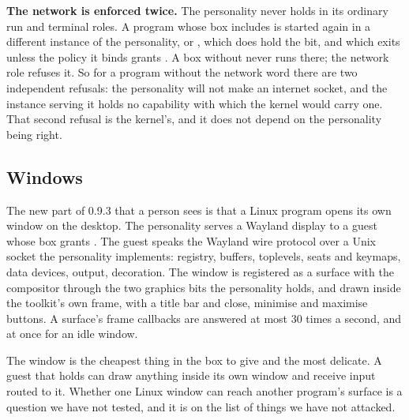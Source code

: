 \textbf{The network is enforced twice.} The personality never holds  in its ordinary run and terminal roles. A program whose box includes  is started again in a different instance of the personality,  or , which does hold the  bit, and which exits unless the policy it binds grants . A box without  never runs there; the network role refuses it. So for a program without the network word there are two independent refusals: the personality will not make an internet socket, and the instance serving it holds no capability with which the kernel would carry one. That second refusal is the kernel's, and it does not depend on the personality being right.

\subsection{Windows}

The new part of 0.9.3 that a person sees is that a Linux program opens its own window on the \nonos{} desktop. The personality serves a Wayland display to a guest whose box grants . The guest speaks the Wayland wire protocol over a Unix socket the personality implements: registry,  buffers,  toplevels, seats and keymaps, data devices, output, decoration. The window is registered as a surface with the compositor through the two graphics bits the personality holds, and drawn inside the toolkit's own frame, with a \nonos{} title bar and close, minimise and maximise buttons. A surface's frame callbacks are answered at most 30 times a second, and at once for an idle window.

The window is the cheapest thing in the box to give and the most delicate. A guest that holds  can draw anything inside its own window and receive input routed to it. Whether one Linux window can reach another program's surface is a question we have not tested, and it is on the list of things we have not attacked.

